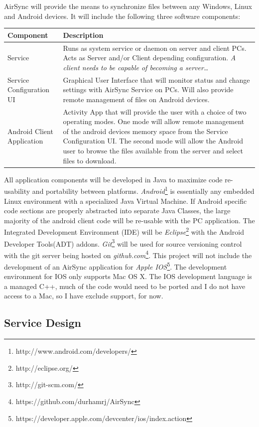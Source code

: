 \documentclass[12pt]{article}
\begin{document}
AirSync will provide the means to synchronize files between any Windows, Linux and Android devices. It will include the following three software components: 
\normalsize
\begin{center}
\begin{tabular}{|l|p{7.5cm}|}
\hline
	\textbf{Component} & \textbf{Description} \\
\hline
	Service 
	& Runs as system service or daemon on server and client PCs. Acts as Server and/or Client depending configuration. \emph{A client needs to be capable of becoming a server\ldots} \\
\hline 
	Service Configuration UI & Graphical User Interface that will monitor status and change settings with AirSync Service on PCs. Will also provide remote management of files on Android devices.\\
\hline
	Android Client Application & Activity App that will provide the user with a choice of two operating modes. One mode will allow remote management of the android devices memory space from the Service Configuration UI. The second mode will allow the Android user to browse the files available from the server and select files to download.\\
\hline
\end{tabular}
\end{center}
\normalsize
All application components will be developed in Java to maximize code re-usability and portability between platforms. \emph{Android}\footnote{http://www.android.com/developers/} is essentially any embedded Linux environment with a specialized Java Virtual Machine. If Android specific code sections are properly abstracted into separate Java Classes, the large majority of the android client code will be re-usable with the PC application. The Integrated Development Environment (IDE) will be \emph{Eclipse}\footnote{http://eclipse.org/} with the Android Developer Tools(ADT) addons. \emph{Git}\footnote{http://git-scm.com/} will be used for source versioning control with the git server being hosted on \emph{github.com}\footnote{https://github.com/durhamrj/AirSync}. This project will not include the development of an AirSync application for \emph{Apple IOS}\footnote{https://developer.apple.com/devcenter/ios/index.action}. The development environment for IOS only supports Mac OS X. The IOS development language is a managed C++, much of the code would need to be ported and I do not have access to a Mac, so I have exclude support, for now. 

\subsection{Service Design}
\end{document}

